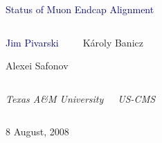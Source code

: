 \documentclass[compress]{beamer}
\begin{document}
\begin{frame}
\vfill
\begin{center}
\textcolor{darkblue}{\Large Status of Muon Endcap Alignment}

\vfill
\begin{columns}
\begin{center}
\large
\textcolor{darkblue}{Jim Pivarski}

\vspace{0.2 cm}
Alexei Safonov
\end{center}

\begin{center}
\large
K\'aroly Banicz
\end{center}
\end{columns}

\begin{columns}
\begin{center}
\scriptsize
{\it Texas A\&M University}
\end{center}
\begin{center}
\scriptsize
{\it US-CMS}
\end{center}
\end{columns}

\vfill
 8 August, 2008

\end{center}
\end{frame}

\end{document}
